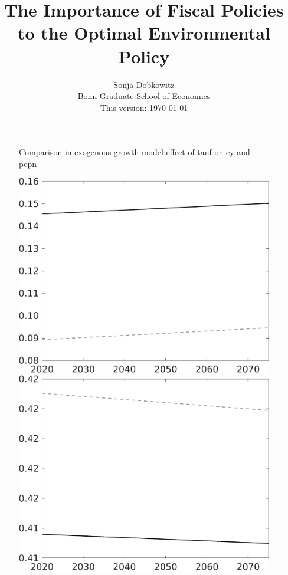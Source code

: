 \documentclass[12pt]{article}
\title{The Importance of Fiscal Policies to the Optimal Environmental Policy}
\date{Sonja Dobkowitz\\ Bonn Graduate School of Economics\\ %
	\vspace{1mm}
	This version: \today }
\begin{document}
	
	\begin{figure}{Comparison in exogenous growth model effect of tauf on ey and pepn }
		\begin{minipage}[]{0.32\textwidth}
			\includegraphics[width=1\textwidth]{../../codding_model/own_basedOnFried/optimalPol_010922_revision/figures/all_13Sept22/LevTaufNoTauf_TaulCalib_regime0_pepn_spillover0_nsk0_xgr1_knspil1_sep0_LFlimit0_emsbase0_countec0_GovRev0_etaa0.79_lgd0.png}
		\end{minipage}
		\begin{minipage}[]{0.32\textwidth}
			\includegraphics[width=1\textwidth]{../../codding_model/own_basedOnFried/optimalPol_010922_revision/figures/all_13Sept22/LevTaufNoTauf_TaulCalib_regime0_EY_spillover0_nsk0_xgr1_knspil1_sep0_LFlimit0_emsbase0_countec0_GovRev0_etaa0.79_lgd0.png}

\end{minipage}
\end{figure}
\end{document}
